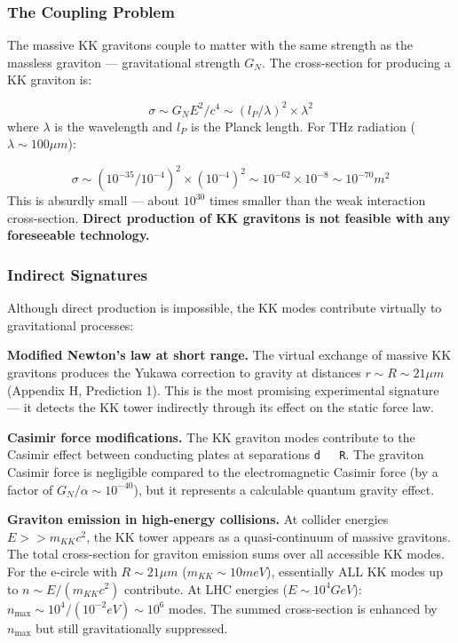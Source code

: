 \documentclass[aps,prd,preprint,superscriptaddress,longbibliography,floatfix]{revtex4-2}
\theoremstyle{remark}
\begin{document}
\subsubsection{The Coupling Problem}

The massive KK gravitons couple to matter with the same strength as the massless graviton --- gravitational strength $G_N$. The cross-section for producing a KK graviton is:


\begin{equation}
    \sigma \sim  G_N E^{2}/c^{4} \sim  (l_P/\lambda)^{2} \times \lambda^{2}
\end{equation}
where $\lambda$ is the wavelength and $l_P$ is the Planck length. For THz radiation ($\lambda \sim  100 \mu m$):


\begin{equation}
    \sigma \sim  (10^{-35}/10^{-4})^{2} \times (10^{-4})^{2} \sim  10^{-62} \times 10^{-8} \sim  10^{-70} m^{2}
\end{equation}
This is absurdly small --- about $10^{30}$ times smaller than the weak interaction cross-section. \textbf{Direct production of KK gravitons is not feasible with any foreseeable technology.}


\subsubsection{Indirect Signatures}

Although direct production is impossible, the KK modes contribute virtually to gravitational processes:

\textbf{Modified Newton's law at short range.} The virtual exchange of massive KK gravitons produces the Yukawa correction to gravity at distances $r \sim  R \sim  21 \mu m$ (Appendix H, Prediction 1). This is the most promising experimental signature --- it detects the KK tower indirectly through its effect on the static force law.

\textbf{Casimir force modifications.} The KK graviton modes contribute to the Casimir effect between conducting plates at separations \texttt{d ~ R}. The graviton Casimir force is negligible compared to the electromagnetic Casimir force (by a factor of $G_N/\alpha \sim  10^{-40}$), but it represents a calculable quantum gravity effect.

\textbf{Graviton emission in high-energy collisions.} At collider energies $E >> m_{KK} c^{2}$, the KK tower appears as a quasi-continuum of massive gravitons. The total cross-section for graviton emission sums over all accessible KK modes. For the e-circle with $R \sim  21 \mu m$ ($m_{KK} \sim  10 meV$), essentially ALL KK modes up to $n \sim  E/(m_{KK} c^{2})$ contribute. At LHC energies ($E \sim  10^{4} GeV$): $n_{\max} \sim  10^{4}/(10^{-2} eV) \sim  10^{6}$ modes. The summed cross-section is enhanced by $n_{\max}$ but still gravitationally suppressed.
\end{document}
